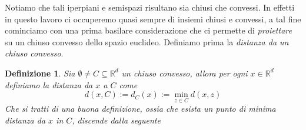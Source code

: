 \documentclass[a4paper,12pt,italian]{article}
\newcommand{\Rd}{\mathbb{R}^d}
\newtheorem{defin}{Definizione}
\begin{document}
Notiamo che tali iperpiani e semispazi risultano sia chiusi che convessi. In effetti in questo lavoro ci occuperemo quasi sempre di
insiemi chiusi e convessi, a tal fine cominciamo con una prima basilare considerazione che ci permette di \emph{proiettare} su un chiuso
convesso dello spazio euclideo. Definiamo prima la \emph{distanza da un chiuso convesso}.

\begin{defin}
Sia $\emptyset\neq C\subseteq\Rd$ un chiuso convesso, allora per ogni $x\in\Rd$ definiamo la distanza da $x$ a $C$ come
\begin{equation}
d(x,C):=d_C(x):=\min_{z\in C}d(x,z)
\end{equation}
Che si tratti di una buona definizione, ossia che esista un punto di minima distanza da $x$ in $C$, discende dalla seguente
\end{defin}
\end{document}
